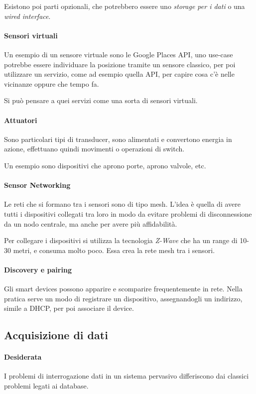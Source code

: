 Esistono poi parti opzionali, che potrebbero essere uno \emph{storage per i dati} o 
una \emph{wired interface}.

\paragraph{Sensori virtuali}
Un esempio di un sensore virtuale sono le Google Places API, 
uno use-case potrebbe essere individuare la posizione 
tramite un sensore classico, per poi utilizzare 
un servizio, come ad esempio quella API, per capire cosa c'è 
nelle vicinanze oppure che tempo fa. 

Si può pensare a quei servizi come una sorta di sensori virtuali.

\paragraph{Attuatori}
Sono particolari tipi di transducer, sono alimentati e convertono 
energia in azione, effettuano quindi movimenti o operazioni 
di switch.

Un esempio sono dispositivi che aprono porte, aprono valvole, 
etc.

\paragraph{Sensor Networking}
Le reti che si formano tra i sensori sono di tipo mesh. 
L'idea è quella di avere tutti i dispositivi collegati tra loro 
in modo da evitare problemi di disconnessione da un nodo centrale, 
ma anche per avere più affidabilità.

Per collegare i dispositivi si utilizza la tecnologia \emph{Z-Wave}
che ha un range di 10-30 metri, e consuma molto poco. Essa 
crea la rete mesh tra i sensori.

\paragraph{Discovery e pairing}
Gli smart devices possono apparire e scomparire frequentemente in rete. 
Nella pratica serve un modo di registrare un dispositivo, assegnandogli un 
indirizzo, simile a DHCP, per poi associare il device.

\subsection{Acquisizione di dati}

\paragraph{Desiderata}
I problemi di interrogazione dati in un sistema pervasivo differiscono 
dai classici problemi legati ai database.

